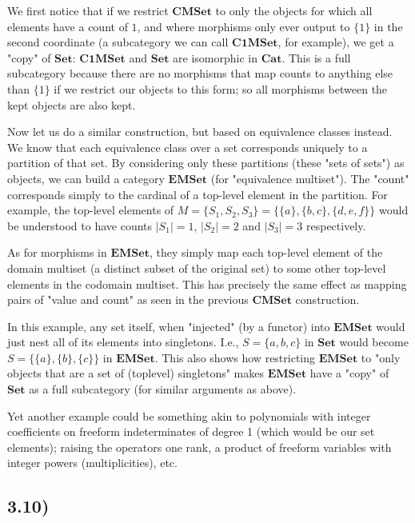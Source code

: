 \documentclass[12pt, letterpaper, twoside]{report}
\begin{document}
We first notice that if we restrict $\mathbf{CMSet}$ to only the objects for which all elements have a count of $1$, and where morphisms only ever output to $\{ 1 \}$ in the second coordinate (a subcategory we can call $\mathbf{C1MSet}$, for example), we get a "copy" of $\mathbf{Set}$: $\mathbf{C1MSet}$ and $\mathbf{Set}$ are isomorphic in $\mathbf{Cat}$. This is a full subcategory because there are no morphisms that map counts to anything else than $\{ 1 \}$ if we restrict our objects to this form; so all morphisms between the kept objects are also kept. 

Now let us do a similar construction, but based on equivalence classes instead. We know that each equivalence class over a set corresponds uniquely to a partition of that set. By considering only these partitions (these "sets of sets") as objects, we can build a category $\mathbf{EMSet}$ (for "equivalence multiset"). The "count" corresponds simply to the cardinal of a top-level element in the partition. For example, the top-level elements of $M = \{ S_1, S_2, S_3 \}= \{ \{a\}, \{b, c\}, \{d, e, f\} \}$ would be understood to have counts $|S_1| = 1$, $|S_2| = 2$ and $|S_3| = 3$ respectively.

As for morphisms in $\mathbf{EMSet}$, they simply map each top-level element of the domain multiset (a distinct subset of the original set) to some other top-level elements in the codomain multiset. This has precisely the same effect as mapping pairs of "value and count" as seen in the previous $\mathbf{CMSet}$ construction.

In this example, any set itself, when "injected" (by a functor) into $\mathbf{EMSet}$ would just nest all of its elements into singletons. I.e., $S = \{ a, b, c \}$ in $\mathbf{Set}$ would become $S = \{ \{a\}, \{b\}, \{c\} \}$ in $\mathbf{EMSet}$. This also shows how restricting $\mathbf{EMSet}$ to "only objects that are a set of (toplevel) singletons" makes $\mathbf{EMSet}$ have a "copy" of $\mathbf{Set}$ as a full subcategory (for similar arguments as above).

Yet another example could be something akin to polynomials with integer coefficients on freeform indeterminates of degree 1 (which would be our set elements); raising the operators one rank, a product of freeform variables with integer powers (multiplicities), etc.


\subsection*{3.10)}
\end{document}
